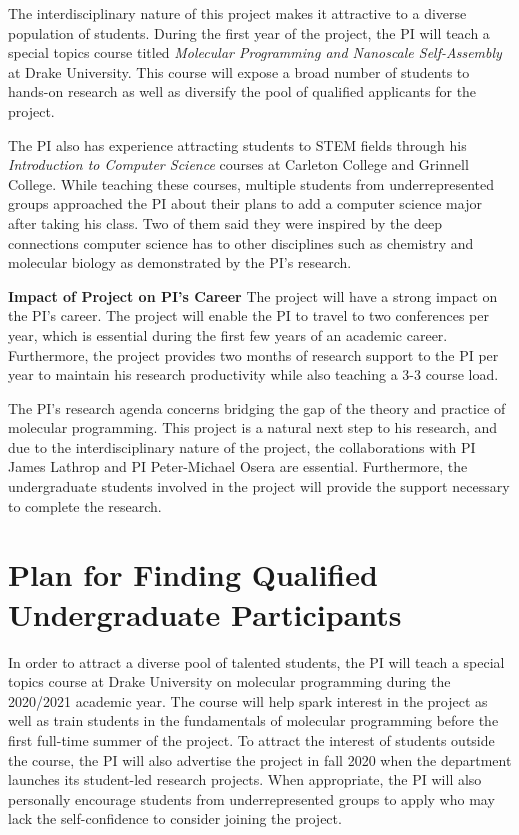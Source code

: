 \documentclass[11pt]{article}
\begin{document}
    The interdisciplinary nature of this project makes it attractive to a diverse population of students.
    During the first year of the project, the PI will teach a special topics course titled \emph{Molecular Programming and Nanoscale Self-Assembly} at Drake University.
    This course will expose a broad number of students to hands-on research as well as diversify the pool of qualified applicants for the project.

    The PI also has experience attracting students to STEM fields through his \emph{Introduction to Computer Science} courses at Carleton College and Grinnell College.
    While teaching these courses, multiple students from underrepresented groups approached the PI about their plans to add a computer science major after taking his class.
    Two of them said they were inspired by the deep connections computer science has to other disciplines such as chemistry and molecular biology as demonstrated by the PI's research.

    \textbf{Impact of Project on PI's Career}
    The project will have a strong impact on the PI's career.
    The project will enable the PI to travel to two conferences per year, which is essential during the first few years of an academic career.
    Furthermore, the project provides two months of research support to the PI per year to maintain his research productivity while also teaching a 3-3 course load.

    The PI's research agenda concerns bridging the gap of the theory and practice of molecular programming.
    This project is a natural next step to his research, and due to the interdisciplinary nature of the project, the collaborations with PI James Lathrop and PI Peter-Michael Osera are essential.
    Furthermore, the undergraduate students involved in the project will provide the support necessary to complete the research.

    \section{Plan for Finding Qualified Undergraduate Participants}
    In order to attract a diverse pool of talented students, the PI will teach a special topics course at Drake University on molecular programming during the 2020/2021 academic year.
    The course will help spark interest in the project as well as train students in the fundamentals of molecular programming before the first full-time summer of the project.
    To attract the interest of students outside the course, the PI will also advertise the project in fall 2020 when the department launches its student-led research projects.
    When appropriate, the PI will also personally encourage students from underrepresented groups to apply who may lack the self-confidence to consider joining the project.
\end{document}
